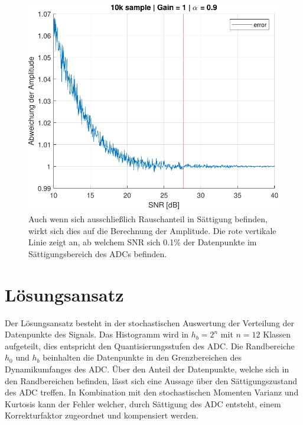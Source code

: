  \begin{figure}[h!] 
	\centering 
	\includegraphics[width=1\columnwidth]{../img/noise-err.pdf}
	\caption{Auch wenn sich ausschließlich Rauschanteil in Sättigung befinden, wirkt sich dies auf die Berechnung der Amplitude. Die rote vertikale Linie zeigt an, ab welchem SNR sich 0.1\% der Datenpunkte im Sättigungsbereich des ADCs befinden.}
	\label{fig:Rauschanteil}
\end{figure}

\section{Lösungsansatz} 
 
Der Lösungsansatz besteht in der stochastischen Auswertung der Verteilung der Datenpunkte des Signals. Das Histogramm wird in $h_b = 2^n$ mit $n = 12$ Klassen aufgeteilt, dies entspricht den Quantisierungsstufen des ADC. Die Randbereiche $h_0$ und $h_b$ beinhalten die Datenpunkte in den Grenzbereichen des Dynamikumfanges des ADC. Über den Anteil der Datenpunkte, welche sich in den Randbereichen befinden, lässt sich eine Aussage über den Sättigungszustand des ADC treffen. In Kombination mit den stochastischen Momenten Varianz und Kurtosis kann der Fehler welcher, durch Sättigung des ADC entsteht, einem Korrekturfaktor zugeordnet und kompensiert werden. 

